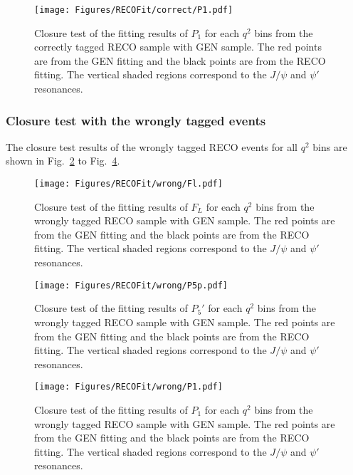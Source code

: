 \begin{figure}[!hbt]
  \centering
  \texttt{[image: Figures/RECOFit/correct/P1.pdf]}
  \caption{Closure test of the fitting results of $P_1$ for each $q^2$
    bins from the correctly tagged  RECO sample with GEN sample.  The red points are
    from the GEN fitting and the black points are from the RECO
    fitting. The vertical shaded regions correspond to the $J/\psi$ and $\psi'$ resonances.}
  \label{fig:correct-closure-p1}
\end{figure}

\clearpage

\subsubsection{Closure test with the wrongly tagged events}
\label{sec:fitval-closure-wtag}

The closure test results of the wrongly tagged RECO events for all
$q^2$ bins are shown in Fig.~\ref{fig:wrong-closure-fl} to
Fig.~\ref{fig:wrong-closure-p1}.

\begin{figure}[!hbt]
  \centering
  \texttt{[image: Figures/RECOFit/wrong/Fl.pdf]}
  \caption{Closure test of the fitting results of $F_L$ for each $q^2$
    bins from the wrongly tagged RECO sample with GEN sample.  The red points are
    from the GEN fitting and the black points are from the RECO
    fitting. The vertical shaded regions correspond to the $J/\psi$ and $\psi'$ resonances. }
  \label{fig:wrong-closure-fl}
\end{figure}


\begin{figure}[!hbt]
  \centering
  \texttt{[image: Figures/RECOFit/wrong/P5p.pdf]}
  \caption{Closure test of the fitting results of $P_5'$ for each $q^2$
    bins from the wrongly tagged  RECO sample with GEN sample.  The red points are
    from the GEN fitting and the black points are from the RECO
    fitting. The vertical shaded regions correspond to the $J/\psi$ and $\psi'$ resonances. }
  \label{fig:wrong-closure-p5p}
\end{figure}

\begin{figure}[!hbt]
  \centering
  \texttt{[image: Figures/RECOFit/wrong/P1.pdf]}
  \caption{Closure test of the fitting results of $P_1$ for each $q^2$
    bins from the wrongly tagged  RECO sample with GEN sample.  The red points are
    from the GEN fitting and the black points are from the RECO
    fitting. The vertical shaded regions correspond to the $J/\psi$ and $\psi'$ resonances. }
  \label{fig:wrong-closure-p1}
\end{figure}

